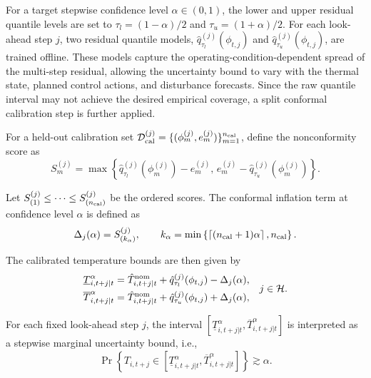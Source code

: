 \documentclass[journal]{IEEEtran}
\theoremstyle{remark}
\begin{document}
For a target stepwise confidence level \(\alpha\in(0,1)\), the lower
and upper residual quantile levels are set to
\(\tau_l=(1-\alpha)/2\) and \(\tau_u=(1+\alpha)/2\). For each
look-ahead step \(j\), two residual quantile models,
\(\hat q_{\tau_l}^{(j)}(\phi_{t,j})\) and
\(\hat q_{\tau_u}^{(j)}(\phi_{t,j})\), are trained offline. These
models capture the operating-condition-dependent spread of the
multi-step residual, allowing the uncertainty bound to vary with the
thermal state, planned control actions, and disturbance forecasts.
Since the raw quantile interval may not achieve the desired empirical
coverage, a split conformal calibration step is further applied.

For a held-out calibration set
$\mathcal D_{\rm cal}^{(j)}=\{(\phi_m^{(j)},e_m^{(j)})\}_{m=1}^{n_{\rm cal}}$,
define the nonconformity score as
\begin{equation}
	S_m^{(j)}
	=
	\max\left\{
	\hat q_{\tau_l}^{(j)}(\phi_m^{(j)})-e_m^{(j)},
	\,
	e_m^{(j)}-\hat q_{\tau_u}^{(j)}(\phi_m^{(j)})
	\right\}.
	\label{eq:nonconformity_score}
\end{equation}

Let
\(S_{(1)}^{(j)}\le \cdots \le S_{(n_{\rm cal})}^{(j)}\)
be the ordered scores. The conformal inflation term at confidence
level \(\alpha\) is defined as
\begin{equation}
	\Delta_j(\alpha)
	=
	S_{(k_\alpha)}^{(j)},
	\qquad
	k_\alpha
	=
	\min\left\{
	\left\lceil (n_{\rm cal}+1)\alpha \right\rceil,
	n_{\rm cal}
	\right\}.
	\label{eq:conformal_inflation}
\end{equation}

The calibrated temperature bounds are then given by
\begin{equation}
	\begin{aligned}
		\underline T^\alpha_{i,t+j|t}
		&=
		\hat T^{\rm nom}_{i,t+j|t}
		+
		\hat q_{\tau_l}^{(j)}(\phi_{t,j})
		-
		\Delta_j(\alpha),\\
		\overline T^\alpha_{i,t+j|t}
		&=
		\hat T^{\rm nom}_{i,t+j|t}
		+
		\hat q_{\tau_u}^{(j)}(\phi_{t,j})
		+
		\Delta_j(\alpha),
	\end{aligned}
	\quad j\in\mathcal H .
	\label{eq:calibrated_temperature_bounds}
\end{equation}

For each fixed look-ahead step \(j\), the interval
\([\underline T^\alpha_{i,t+j|t},
\overline T^\alpha_{i,t+j|t}]\) is interpreted as a stepwise marginal
uncertainty bound, i.e.,
\begin{equation}
	\Pr\left\{
	T_{i,t+j}
	\in
	\left[
	\underline T^\alpha_{i,t+j|t},
	\overline T^\alpha_{i,t+j|t}
	\right]
	\right\}
	\gtrsim
	\alpha .
	\label{eq:stepwise_coverage}
\end{equation}
\end{document}
